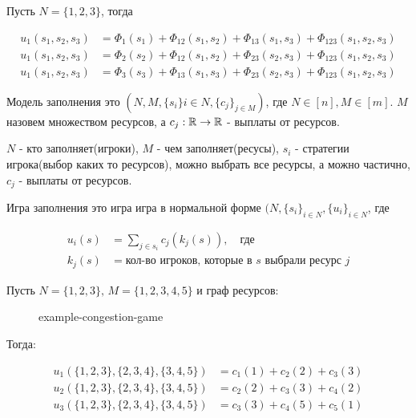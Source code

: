 \begin{exmpl}
	Пусть $N = \{1, 2, 3\}$, тогда 

	\begin{align*}
		u_1(s_1, s_2, s_3) &= \Phi_1(s_1) + \Phi_{12}(s_1, s_2) + \Phi_{13}(s_1, s_3) + \Phi_{123}(s_1, s_2, s_3) \\
		u_1(s_1, s_2, s_3) &= \Phi_2(s_2) + \Phi_{12}(s_1, s_2) + \Phi_{23}(s_2, s_3) + \Phi_{123}(s_1, s_2, s_3) \\
		u_1(s_1, s_2, s_3) &= \Phi_3(s_3) + \Phi_{13}(s_1, s_3) + \Phi_{23}(s_2, s_3) + \Phi_{123}(s_1, s_2, s_3)
	\end{align*}

\end{exmpl}

\begin{df}
	Модель заполнения это $(N, M, \{s_i\}{i \in N}, \{c_j\}_{j \in M})$, где  $N \in [n], M \in [m]$.
	$M$ назовем множеством ресурсов, а  $c_j: \mathbb{R} \to \mathbb{R}$ - выплаты от ресурсов.

	 $N$ - кто заполняет(игроки),  $M$ - чем заполняет(ресусы), $s_i$ - стратегии игрока(выбор каких то ресурсов), можно выбрать все ресурсы, а можно частично,  $c_j$ - выплаты от ресурсов. 
\end{df}

\begin{df}
	Игра заполнения это игра игра в нормальной форме $(N, \{s_i\}_{i \in N}, \{u_i\}_{i \in N}$, где 

	\begin{align*}
		u_i(s) &= \sum_{j \in s_i} c_j(k_j(s)), \quad \text{где} \\
		k_j(s) &= \text{кол-во игроков, которые в $s$ выбрали ресурс  $j$}
	\end{align*}

\end{df}

\begin{exmpl}
	Пусть $N = \{1, 2, 3\}, \, M = \{1, 2, 3, 4, 5\}$ и граф ресурсов:
\begin{figure}[ht]
    \centering
    \caption{example-congestion-game}
    \label{fig:example-congestion-game}
\end{figure}

Тогда:

\begin{align*}
	u_1(\{1, 2, 3\}, \{2, 3, 4\}, \{3, 4, 5\}) &= c_1(1) + c_2(2) + c_3(3) \\
	u_2(\{1, 2, 3\}, \{2, 3, 4\}, \{3, 4, 5\}) &= c_2(2) + c_3(3) + c_4(2) \\
	u_3(\{1, 2, 3\}, \{2, 3, 4\}, \{3, 4, 5\}) &= c_3(3) + c_4(5) + c_5(1)
\end{align*}

\end{exmpl}


